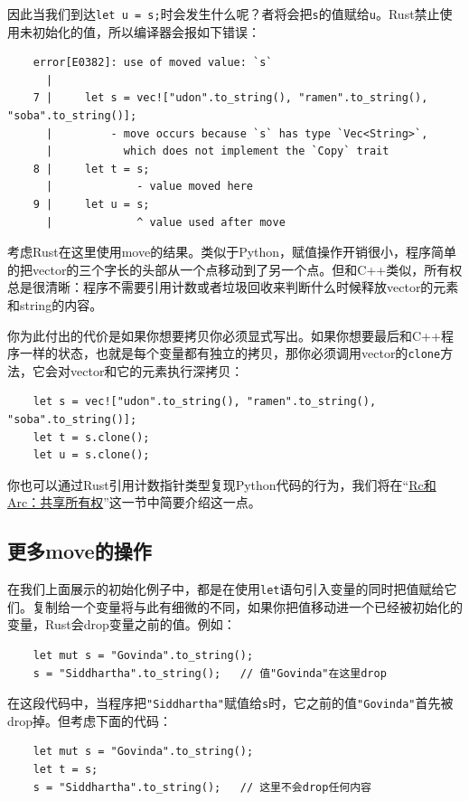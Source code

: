 因此当我们到达\texttt{let u = s;}时会发生什么呢？者将会把\texttt{s}的值赋给\texttt{u}。Rust禁止使用未初始化的值，所以编译器会报如下错误：
\begin{verbatim}
    error[E0382]: use of moved value: `s`
      |
    7 |     let s = vec!["udon".to_string(), "ramen".to_string(), "soba".to_string()];
      |         - move occurs because `s` has type `Vec<String>`,
      |           which does not implement the `Copy` trait
    8 |     let t = s;
      |             - value moved here
    9 |     let u = s;
      |             ^ value used after move
\end{verbatim}

考虑Rust在这里使用move的结果。类似于Python，赋值操作开销很小，程序简单的把vector的三个字长的头部从一个点移动到了另一个点。但和C++类似，所有权总是很清晰：程序不需要引用计数或者垃圾回收来判断什么时候释放vector的元素和string的内容。

你为此付出的代价是如果你想要拷贝你必须显式写出。如果你想要最后和C++程序一样的状态，也就是每个变量都有独立的拷贝，那你必须调用vector的\texttt{clone}方法，它会对vector和它的元素执行深拷贝：
\begin{verbatim}
    let s = vec!["udon".to_string(), "ramen".to_string(), "soba".to_string()];
    let t = s.clone();
    let u = s.clone();
\end{verbatim}

你也可以通过Rust引用计数指针类型复现Python代码的行为，我们将在“\hyperref[rc]{Rc和Arc：共享所有权}”这一节中简要介绍这一点。

\subsection{更多move的操作}

在我们上面展示的初始化例子中，都是在使用\texttt{let}语句引入变量的同时把值赋给它们。复制给一个变量将与此有细微的不同，如果你把值移动进一个已经被初始化的变量，Rust会drop变量之前的值。例如：
\begin{verbatim}
    let mut s = "Govinda".to_string();
    s = "Siddhartha".to_string();   // 值"Govinda"在这里drop
\end{verbatim}

在这段代码中，当程序把\texttt{"Siddhartha"}赋值给\texttt{s}时，它之前的值\texttt{"Govinda"}首先被drop掉。但考虑下面的代码：
\begin{verbatim}
    let mut s = "Govinda".to_string();
    let t = s;
    s = "Siddhartha".to_string();   // 这里不会drop任何内容
\end{verbatim}

